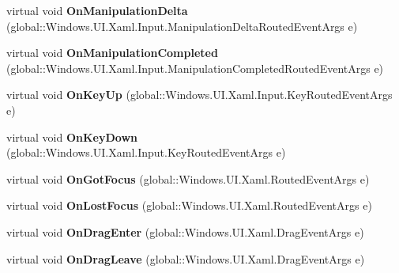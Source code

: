 \begin{DoxyCompactItemize}
virtual void {\bfseries On\+Manipulation\+Delta} (global\+::\+Windows.\+U\+I.\+Xaml.\+Input.\+Manipulation\+Delta\+Routed\+Event\+Args e)
\item 
\mbox{\label{class_windows_1_1_u_i_1_1_xaml_1_1_controls_1_1_control_a3304447f6f0bbb3c475cf58171d08f90}} 
virtual void {\bfseries On\+Manipulation\+Completed} (global\+::\+Windows.\+U\+I.\+Xaml.\+Input.\+Manipulation\+Completed\+Routed\+Event\+Args e)
\item 
\mbox{\label{class_windows_1_1_u_i_1_1_xaml_1_1_controls_1_1_control_a1b0d2df4f065db71ccbe2b00e5c5035f}} 
virtual void {\bfseries On\+Key\+Up} (global\+::\+Windows.\+U\+I.\+Xaml.\+Input.\+Key\+Routed\+Event\+Args e)
\item 
\mbox{\label{class_windows_1_1_u_i_1_1_xaml_1_1_controls_1_1_control_aaebebc38e0d403c52a9c26f0ce100664}} 
virtual void {\bfseries On\+Key\+Down} (global\+::\+Windows.\+U\+I.\+Xaml.\+Input.\+Key\+Routed\+Event\+Args e)
\item 
\mbox{\label{class_windows_1_1_u_i_1_1_xaml_1_1_controls_1_1_control_aebc0df2e4f8c22faf21c84575482274e}} 
virtual void {\bfseries On\+Got\+Focus} (global\+::\+Windows.\+U\+I.\+Xaml.\+Routed\+Event\+Args e)
\item 
\mbox{\label{class_windows_1_1_u_i_1_1_xaml_1_1_controls_1_1_control_a68f0c26b5b04bbbeb841be1d3a195224}} 
virtual void {\bfseries On\+Lost\+Focus} (global\+::\+Windows.\+U\+I.\+Xaml.\+Routed\+Event\+Args e)
\item 
\mbox{\label{class_windows_1_1_u_i_1_1_xaml_1_1_controls_1_1_control_ae5a8a218b89ca66425059a8e09fc0c0d}} 
virtual void {\bfseries On\+Drag\+Enter} (global\+::\+Windows.\+U\+I.\+Xaml.\+Drag\+Event\+Args e)
\item 
\mbox{\label{class_windows_1_1_u_i_1_1_xaml_1_1_controls_1_1_control_a1812d64c2440d2cd9f93660273ef5896}} 
virtual void {\bfseries On\+Drag\+Leave} (global\+::\+Windows.\+U\+I.\+Xaml.\+Drag\+Event\+Args e)

\end{DoxyCompactItemize}
